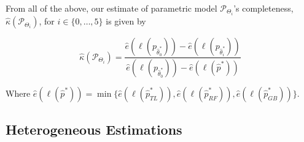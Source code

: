\documentclass[11pt,a4paper]{article}
\theoremstyle{definition}
\begin{document}
From all of the above, our estimate of parametric model \(\mathcal{P}_{\Theta_i}\)'s completeness, \(\hat{\kappa}(\mathcal{P}_{\Theta_i})\),  for \(i\in\{0,\dots, 5\}\) is given by

\begin{equation}
\label{eq:completeness_estim}
\hat{\kappa}(\mathcal{P}_{\Theta_i})=\frac{\hat{e}(\ell(p_{\hat{\theta}^*_0}))-\hat{e}(\ell(p_{\hat{\theta}^*_i}))}{\hat{e}(\ell(p_{\hat{\theta}^*_0}))-\hat{e}(\ell(\hat{p}^*))}
\end{equation}

Where \(\hat{e}(\ell(\hat{p}^*))=\min\{\hat{e}(\ell(\hat{p}^*_{TL})),\hat{e}(\ell(\hat{p}^*_{RF})),\hat{e}(\ell(\hat{p}^*_{GB}))\}\).

\subsection{Heterogeneous Estimations}
\label{sec:heterogenous_estimations}
\end{document}
